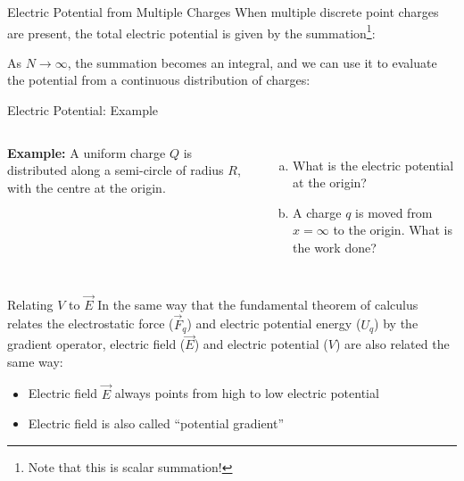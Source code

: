 \documentclass[12pt,aspectratio=169]{beamer}
\begin{document}
\begin{frame}{Electric Potential from Multiple Charges}
  When multiple discrete point charges are present, the total electric
  potential is given by the summation\footnote{Note that this is scalar
  summation!}:


  As $N\rightarrow\infty$, the summation becomes an integral, and we can use it
  to evaluate the potential from a continuous distribution of charges:

  \vspace{.3in}
\end{frame}




\begin{frame}{Electric Potential: Example}
  \begin{columns}
    
    \textbf{Example:} A uniform charge $Q$ is distributed along a semi-circle
    of radius $R$, with the centre at the origin.
    \begin{enumerate}[(a)]
    \item What is the electric potential at the origin?
    \item A charge $q$ is moved from $x=\infty$ to the origin. What is the
      work done?
    \end{enumerate}
  \end{columns}
\end{frame}



\begin{frame}{Relating $V$ to $\vec E$}
  In the same way that the fundamental theorem of calculus relates the 
  electrostatic force ($\vec F_q$) and electric potential energy ($U_q$) by the
  gradient operator, electric field ($\vec E$) and electric potential ($V$) are
  also related the same way:

  \begin{itemize}
  \item Electric field $\vec E$ always points from high to low electric
    potential
  \item Electric field is also called ``potential gradient''
  \end{itemize}
\end{frame}
\end{document}
